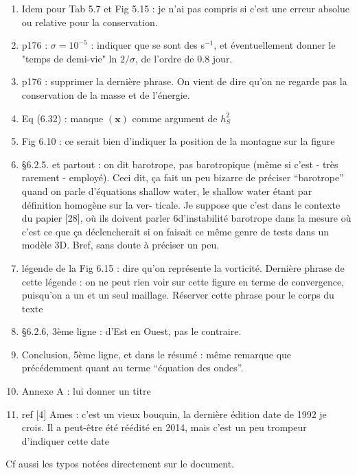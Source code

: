 \documentclass[10pt,a4paper]{article}
\begin{document}
\begin{enumerate}
\item Idem pour Tab 5.7 et Fig 5.15 : je n'ai pas compris si c'est une erreur absolue ou relative pour la conservation.


\item p176 : $\sigma = 10^{-5}$ : indiquer que se sont des s$^{-1}$, et éventuellement donner le "temps de demi-vie" ln $2/\sigma$, de l'ordre de $0.8$ jour.

\item p176 : supprimer la dernière phrase. On vient de dire qu'on ne regarde pas la conservation de la masse et de l'énergie.


\item Eq (6.32) : manque $(\mathbf{x})$ comme argument de $h_S^2$


\item Fig 6.10 : ce serait bien d'indiquer la position de la montagne sur la figure


\item §6.2.5. et partout : on dit barotrope, pas barotropique (même si c’est - très rarement
- employé). Ceci dit, ça fait un peu bizarre de préciser “barotrope” quand on parle
d’équations shallow water, le shallow water étant par définition homogène sur la ver-
ticale. Je suppose que c’est dans le contexte du papier [28], où ils doivent parler
6d’instabilité barotrope dans la mesure où c’est ce que ça déclencherait si on faisait ce
même genre de tests dans un modèle 3D. Bref, sans doute à préciser un peu.


\item légende de la Fig 6.15 : dire qu’on représente la vorticité. Dernière phrase de cette
légende : on ne peut rien voir sur cette figure en terme de convergence, puisqu’on a un
et un seul maillage. Réserver cette phrase pour le corps du texte


\item §6.2.6, 3ème ligne : d’Est en Ouest, pas le contraire.


\item Conclusion, 5ème ligne, et dans le résumé : même remarque que précédemment quant
au terme “équation des ondes”.


\item Annexe A : lui donner un titre


\item ref [4] Ames : c’est un vieux bouquin, la dernière édition date de 1992 je crois. Il a
peut-être été réédité en 2014, mais c’est un peu trompeur d’indiquer cette date










\end{enumerate}

Cf aussi les typos notées directement sur le document.
\end{document}
